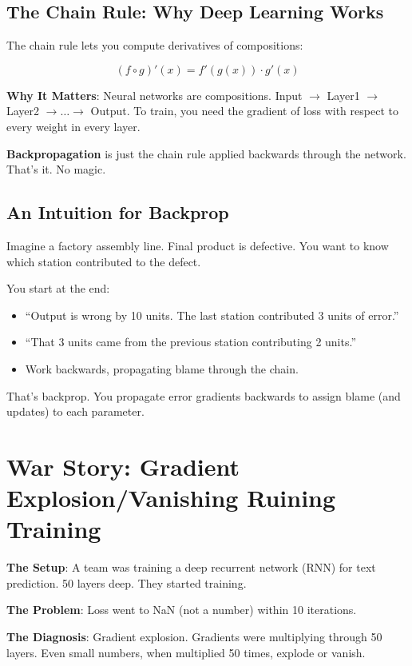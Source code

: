 \documentclass[11pt,oneside]{book}
\begin{document}
\subsection{The Chain Rule: Why Deep Learning Works}

The chain rule lets you compute derivatives of compositions:

\[
(f \circ g)'(x) = f'(g(x)) \cdot g'(x)
\]

\textbf{Why It Matters}: Neural networks are compositions. Input $\rightarrow$ Layer1 $\rightarrow$ Layer2 $\rightarrow \ldots \rightarrow$ Output. To train, you need the gradient of loss with respect to every weight in every layer.

\textbf{Backpropagation} is just the chain rule applied backwards through the network. That's it. No magic.

\subsection{An Intuition for Backprop}

Imagine a factory assembly line. Final product is defective. You want to know which station contributed to the defect.

You start at the end:
\begin{itemize}
\item ``Output is wrong by 10 units. The last station contributed 3 units of error.''
\item ``That 3 units came from the previous station contributing 2 units.''
\item Work backwards, propagating blame through the chain.
\end{itemize}

That's backprop. You propagate error gradients backwards to assign blame (and updates) to each parameter.

\section{War Story: Gradient Explosion/Vanishing Ruining Training}

\textbf{The Setup}: A team was training a deep recurrent network (RNN) for text prediction. 50 layers deep. They started training.

\textbf{The Problem}: Loss went to NaN (not a number) within 10 iterations.

\textbf{The Diagnosis}: Gradient explosion. Gradients were multiplying through 50 layers. Even small numbers, when multiplied 50 times, explode or vanish.
\end{document}
